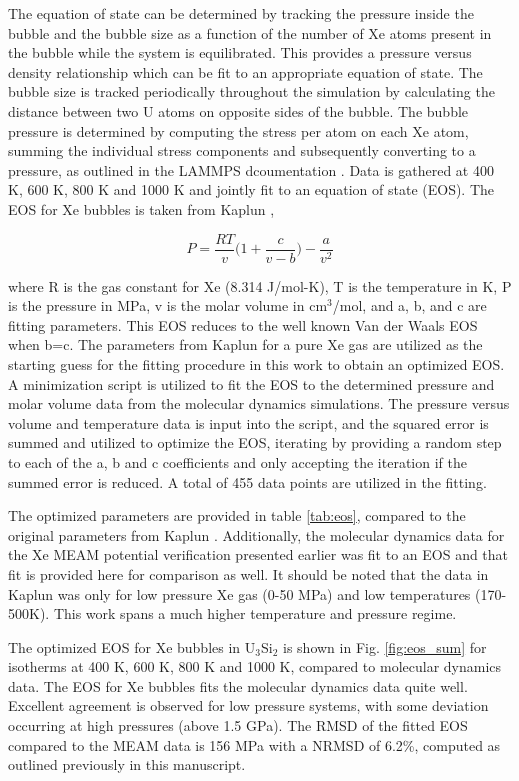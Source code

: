 \documentclass[review]{elsarticle}
\begin{document}
The equation of state can be determined by tracking the pressure inside the bubble and the bubble size as a function of the number of Xe atoms present in the bubble while the system is equilibrated. This provides a pressure versus density relationship which can be fit to an appropriate equation of state. The bubble size is tracked periodically throughout the simulation by calculating the distance between two U atoms on opposite sides of the bubble. The bubble pressure is determined by computing the stress per atom on each Xe atom, summing the individual stress components and subsequently converting to a pressure, as outlined in the LAMMPS dcoumentation \cite{plimpton1995}. Data is gathered at 400 K, 600 K, 800 K and 1000 K and jointly fit to an equation of state (EOS). The EOS for Xe bubbles is taken from Kaplun \cite{kaplun2003}, 

\begin{equation}
\label{eq:EOS}
P=\frac{RT}{v}\bigg( 1+\frac{c}{v-b}\bigg)-\frac{a}{v^2}
\end{equation}
				
where R is the gas constant for Xe (8.314 J/mol-K\cite{kaplun2003}), T is the temperature in K, P is the pressure in MPa, v is the molar volume in cm$^3$/mol, and a, b, and c are fitting parameters. This EOS reduces to the well known Van der Waals EOS when b=c. The parameters from Kaplun \cite{kaplun2003} for a pure Xe gas are utilized as the starting guess for the fitting procedure in this work to obtain an optimized EOS. A minimization script is utilized to fit the EOS to the determined pressure and molar volume data from the molecular dynamics simulations. The pressure versus volume and temperature data is input into the script, and the squared error is summed and utilized to optimize the EOS, iterating by providing a random step to each of the a, b and c coefficients and only accepting the iteration if the summed error is reduced. A total of 455 data points are utilized in the fitting. 

The optimized parameters are provided in table \ref{tab:eos}, compared to the original parameters from Kaplun \cite{kaplun2003}. Additionally, the molecular dynamics data for the Xe MEAM potential verification presented earlier was fit to an EOS and that fit is provided here for comparison as well. It should be noted that the data in Kaplun was only for low pressure Xe gas (0-50 MPa) and low temperatures (170-500K). This work spans a much higher temperature and pressure regime. 

The optimized EOS for Xe bubbles in U$_3$Si$_2$ is shown in Fig. \ref{fig:eos_sum} for isotherms at 400 K, 600 K, 800 K and 1000 K, compared to molecular dynamics data. The EOS for Xe bubbles fits the molecular dynamics data quite well. Excellent agreement is observed for low pressure systems, with some deviation occurring at high pressures (above 1.5 GPa). The RMSD of the fitted EOS compared to the MEAM data is 156 MPa with a NRMSD of 6.2\%, computed as outlined previously in this manuscript. 
\end{document}
